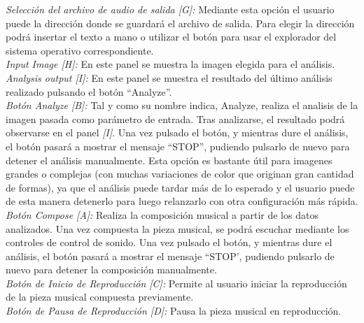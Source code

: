 		\color{blue}\noindent\textit{Selección del archivo de audio de salida [G]:}\color{black}  Mediante esta opción el usuario puede la dirección donde se guardará el archivo de salida. Para elegir la dirección podrá insertar el texto a mano o utilizar el botón para usar el explorador del sistema operativo correspondiente.\\
		
		\color{blue}\noindent\textit{Input Image [H]:}\color{black} En este panel se muestra la imagen elegida para el análisis.\\
		
		\color{blue}\noindent\textit{Analysis output [I]:}\color{black} En este panel se muestra el resultado del último análisis realizado pulsando el botón ``Analyze''.\\
		
		\color{blue}\noindent\textit{Botón Analyze [B]:} Tal y como su nombre indica, Analyze, realiza el analisis de la imagen pasada como parámetro de entrada. Tras analizarse, el resultado podrá observarse en el panel \textit{[I]}. Una vez pulsado el botón, y mientras dure el análisis, el botón pasará a mostrar el mensaje ``STOP'', pudiendo pulsarlo de nuevo para detener el análisis manualmente. Esta opción es bastante útil para imagenes grandes o complejas (con muchas variaciones de color que originan gran cantidad de formas), ya que el análisis puede tardar más de lo esperado y el usuario puede de esta manera detenerlo para luego relanzarlo con otra configuración más rápida.\color{black}\\
		
		\color{blue}\noindent\textit{Botón Compose [A]:}\color{black} Realiza la composición musical a partir de los datos analizados.\color{blue} Una vez compuesta la pieza musical, se podrá escuchar mediante los controles de control de sonido.\color{black} Una vez pulsado el botón, y mientras dure el análisis, el botón pasará a mostrar el mensaje ``STOP', pudiendo pulsarlo de nuevo para detener la composición manualmente.\\
		
		\color{blue}\noindent\textit{Botón de Inicio de Reproducción [C]:} Permite al usuario iniciar la reproducción de la pieza musical compuesta previamente.\color{black}\\
		
		\color{blue}\noindent\textit{Botón de Pausa de Reproducción [D]:}\color{black} Pausa la pieza musical en reproducción.\\
		
